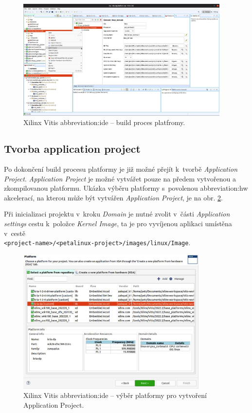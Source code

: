 \documentclass[a4paper, twoside, 11pt]{article}
\newcommand{\fbar}{\FloatBarrier}
\begin{document}
		\begin{figure}[htbp!]
			\centering
			\includegraphics[width=0.95\textwidth]{src/jpg/vitis-build-project-platform.jpg}
			\caption{Xilinx Vitis \gls{abbreviation:ide} – build proces platfromy.}
			\label{fig:vitis-platform-build}
		\end{figure}

		\fbar
		\subsection{Tvorba application project}
		Po dokončení build procesu platformy je již možné přejít k~tvorbě \textit{Application Project}. \textit{Application Project} je možné vytvářet pouze na předem vytvořenou a zkompilovanou platformu. Ukázka výběru platformy s~povolenou \gls{abbreviation:hw} akcelerací, na kterou může být vytvářen \textit{Application Project}, je na obr. \ref{fig:vitis-application-project-platform-selection}.\par
		Při inicializaci projektu v~kroku \textit{Domain} je nutné zvolit v~části \textit{Application settings} cestu k~položce \textit{Kernel Image}, ta je pro vyvíjenou aplikaci umístěna v~cestě\\\texttt{<project-name>/<petalinux-project>/images/linux/Image}.

		\begin{figure}[htbp!]
			\centering
			\includegraphics[width=0.85\textwidth]{src/jpg/vitis-application-project-platform-selection.jpg}
			\caption{Xilinx Vitis \gls{abbreviation:ide} – výběr platformy pro vytvoření Application Project.}
			\label{fig:vitis-application-project-platform-selection}
		\end{figure}
\end{document}
